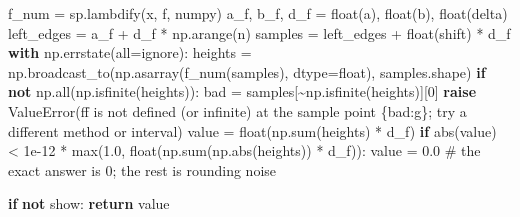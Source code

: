 \documentclass[
  letterpaper,
  DIV=11,
  numbers=noendperiod]{scrreprt}
\newenvironment{Shaded}{\begin{snugshade}}{\end{snugshade}}
\newcommand{\BuiltInTok}[1]{\textcolor[rgb]{0.00,0.23,0.31}{#1}}
\newcommand{\CommentTok}[1]{\textcolor[rgb]{0.37,0.37,0.37}{#1}}
\newcommand{\ControlFlowTok}[1]{\textcolor[rgb]{0.00,0.23,0.31}{\textbf{#1}}}
\newcommand{\DecValTok}[1]{\textcolor[rgb]{0.68,0.00,0.00}{#1}}
\newcommand{\FloatTok}[1]{\textcolor[rgb]{0.68,0.00,0.00}{#1}}
\newcommand{\KeywordTok}[1]{\textcolor[rgb]{0.00,0.23,0.31}{\textbf{#1}}}
\newcommand{\NormalTok}[1]{\textcolor[rgb]{0.00,0.23,0.31}{#1}}
\newcommand{\OperatorTok}[1]{\textcolor[rgb]{0.37,0.37,0.37}{#1}}
\newcommand{\PreprocessorTok}[1]{\textcolor[rgb]{0.68,0.00,0.00}{#1}}
\newcommand{\SpecialCharTok}[1]{\textcolor[rgb]{0.37,0.37,0.37}{#1}}
\newcommand{\SpecialStringTok}[1]{\textcolor[rgb]{0.13,0.47,0.30}{#1}}
\newcommand{\StringTok}[1]{\textcolor[rgb]{0.13,0.47,0.30}{#1}}
\theoremstyle{plain}
\theoremstyle{plain}
\theoremstyle{definition}
\theoremstyle{definition}
\theoremstyle{definition}
\theoremstyle{plain}
\theoremstyle{plain}
\theoremstyle{remark}
\begin{document}
\begin{Shaded}
\begin{Highlighting}[]
\NormalTok{    f\_num }\OperatorTok{=}\NormalTok{ sp.lambdify(x, f, }\StringTok{\textquotesingle{}numpy\textquotesingle{}}\NormalTok{)}
\NormalTok{    a\_f, b\_f, d\_f }\OperatorTok{=} \BuiltInTok{float}\NormalTok{(a), }\BuiltInTok{float}\NormalTok{(b), }\BuiltInTok{float}\NormalTok{(delta)}
\NormalTok{    left\_edges }\OperatorTok{=}\NormalTok{ a\_f }\OperatorTok{+}\NormalTok{ d\_f }\OperatorTok{*}\NormalTok{ np.arange(n)}
\NormalTok{    samples }\OperatorTok{=}\NormalTok{ left\_edges }\OperatorTok{+} \BuiltInTok{float}\NormalTok{(shift) }\OperatorTok{*}\NormalTok{ d\_f}
    \ControlFlowTok{with}\NormalTok{ np.errstate(}\BuiltInTok{all}\OperatorTok{=}\StringTok{\textquotesingle{}ignore\textquotesingle{}}\NormalTok{):}
\NormalTok{        heights }\OperatorTok{=}\NormalTok{ np.broadcast\_to(np.asarray(f\_num(samples), dtype}\OperatorTok{=}\BuiltInTok{float}\NormalTok{), samples.shape)}
    \ControlFlowTok{if} \KeywordTok{not}\NormalTok{ np.}\BuiltInTok{all}\NormalTok{(np.isfinite(heights)):}
\NormalTok{        bad }\OperatorTok{=}\NormalTok{ samples[}\OperatorTok{\textasciitilde{}}\NormalTok{np.isfinite(heights)][}\DecValTok{0}\NormalTok{]}
        \ControlFlowTok{raise} \PreprocessorTok{ValueError}\NormalTok{(}\SpecialStringTok{f\textquotesingle{}f is not defined (or infinite) at the sample point }\SpecialCharTok{\{}\NormalTok{bad}\SpecialCharTok{:g\}}\SpecialStringTok{; \textquotesingle{}}
                         \StringTok{\textquotesingle{}try a different method or interval\textquotesingle{}}\NormalTok{)}
\NormalTok{    value }\OperatorTok{=} \BuiltInTok{float}\NormalTok{(np.}\BuiltInTok{sum}\NormalTok{(heights) }\OperatorTok{*}\NormalTok{ d\_f)}
    \ControlFlowTok{if} \BuiltInTok{abs}\NormalTok{(value) }\OperatorTok{\textless{}} \FloatTok{1e{-}12} \OperatorTok{*} \BuiltInTok{max}\NormalTok{(}\FloatTok{1.0}\NormalTok{, }\BuiltInTok{float}\NormalTok{(np.}\BuiltInTok{sum}\NormalTok{(np.}\BuiltInTok{abs}\NormalTok{(heights)) }\OperatorTok{*}\NormalTok{ d\_f)):}
\NormalTok{        value }\OperatorTok{=} \FloatTok{0.0}          \CommentTok{\# the exact answer is 0; the rest is rounding noise}

    \ControlFlowTok{if} \KeywordTok{not}\NormalTok{ show:}
        \ControlFlowTok{return}\NormalTok{ value}


\end{Highlighting}
\end{Shaded}
\end{document}
